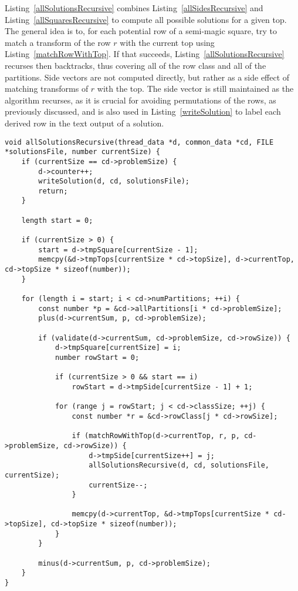 Listing~\ref{allSolutionsRecursive} combines Listing~\ref{allSidesRecursive} and Listing~\ref{allSquaresRecursive} to compute all possible solutions for a given top. The general idea is to, for each potential row of a semi-magic square, try to match a transform of the row $r$ with the current top using Listing~\ref{matchRowWithTop}. If that succeeds, Listing~\ref{allSolutionsRecursive} recurses then backtracks, thus covering all of the row class and all of the partitions. Side vectors are not computed directly, but rather as a side effect of matching transforms of $r$ with the top. The side vector is still maintained as the algorithm recurses, as it is crucial for avoiding permutations of the rows, as previously discussed, and is also used in Listing~\ref{writeSolution} to label each derived row in the text output of a solution.

\begin{lstlisting}[caption={Recursively computing all solutions for a top vector of a certain size.},label={allSolutionsRecursive}]
void allSolutionsRecursive(thread_data *d, common_data *cd, FILE *solutionsFile, number currentSize) {
    if (currentSize == cd->problemSize) {
        d->counter++;
        writeSolution(d, cd, solutionsFile);
        return;
    }

    length start = 0;

    if (currentSize > 0) {
        start = d->tmpSquare[currentSize - 1];
        memcpy(&d->tmpTops[currentSize * cd->topSize], d->currentTop, cd->topSize * sizeof(number));
    }

    for (length i = start; i < cd->numPartitions; ++i) {
        const number *p = &cd->allPartitions[i * cd->problemSize];
        plus(d->currentSum, p, cd->problemSize);

        if (validate(d->currentSum, cd->problemSize, cd->rowSize)) {
            d->tmpSquare[currentSize] = i;
            number rowStart = 0;

            if (currentSize > 0 && start == i)
                rowStart = d->tmpSide[currentSize - 1] + 1;

            for (range j = rowStart; j < cd->classSize; ++j) {
                const number *r = &cd->rowClass[j * cd->rowSize];

                if (matchRowWithTop(d->currentTop, r, p, cd->problemSize, cd->rowSize)) {
                    d->tmpSide[currentSize++] = j;
                    allSolutionsRecursive(d, cd, solutionsFile, currentSize);
                    currentSize--;
                }

                memcpy(d->currentTop, &d->tmpTops[currentSize * cd->topSize], cd->topSize * sizeof(number));
            }
        }

        minus(d->currentSum, p, cd->problemSize);
    }
}
\end{lstlisting}

